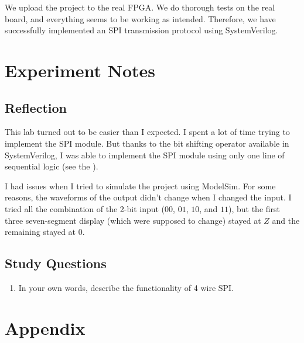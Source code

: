 \documentclass[12pt]{article}
\begin{document}
We upload the project to the real FPGA. We do thorough tests on the real board, and everything seems to be working as intended. Therefore, we have successfully implemented an SPI transmission protocol using SystemVerilog.

\section{Experiment Notes}

\subsection*{Reflection}

This lab turned out to be easier than I expected. I spent a lot of time trying to implement the SPI module. But thanks to the bit shifting operator available in SystemVerilog, I was able to implement the SPI module using only one line of sequential logic (see the ).

I had issues when I tried to simulate the project using ModelSim. For some reasons, the waveforms of the output didn't change when I changed the input. I tried all the combination of the 2-bit input ($00$, $01$, $10$, and $11$), but the first three seven-segment display (which were supposed to change) stayed at $Z$ and the remaining stayed at $0$.

\subsection*{Study Questions}

\begin{enumerate}
  \item In your own words, describe the functionality of 4 wire SPI.

\end{enumerate}

\section*{Appendix} \label{section:Appendix}
\end{document}
